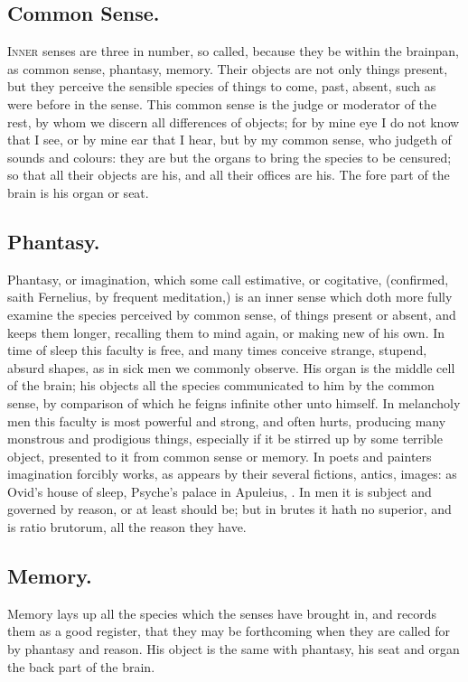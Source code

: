 {\subsection{Common Sense.}
\lettrine{I}{nner} senses are three in number, so called, because
they be within the brainpan, as common sense, phantasy, memory. Their
objects are not only things present, but they perceive the sensible
species of things to come, past, absent, such as were before in the
sense. This common sense is the judge or moderator of the rest, by whom
we discern all differences of objects; for by mine eye I do not know
that I see, or by mine ear that I hear, but by my common sense, who
judgeth of sounds and colours: they are but the organs to bring the
species to be censured; so that all their objects are his, and all
their offices are his. The fore part of the brain is his organ or seat.
\subsection{Phantasy.}
Phantasy, or imagination, which some call estimative, or
cogitative, (confirmed, saith Fernelius, by frequent meditation,)
is an inner sense which doth more fully examine the species perceived
by common sense, of things present or absent, and keeps them longer,
recalling them to mind again, or making new of his own. In time of
sleep this faculty is free, and many times conceive strange, stupend,
absurd shapes, as in sick men we commonly observe. His organ is the
middle cell of the brain; his objects all the species communicated to
him by the common sense, by comparison of which he feigns infinite
other unto himself. In melancholy men this faculty is most powerful and
strong, and often hurts, producing many monstrous and prodigious
things, especially if it be stirred up by some terrible object,
presented to it from common sense or memory. In poets and painters
imagination forcibly works, as appears by their several fictions,
antics, images: as Ovid's house of sleep, Psyche's palace in Apuleius,
\etc{}. In men it is subject and governed by reason, or at least should be;
but in brutes it hath no superior, and is ratio brutorum, all the
reason they have.
\subsection{Memory.}
Memory lays up all the species which the senses have brought
in, and records them as a good register, that they may be forthcoming
when they are called for by phantasy and reason. His object is the same
with phantasy, his seat and organ the back part of the brain.
}
